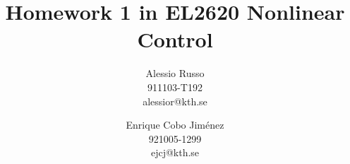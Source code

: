 \documentclass[a4paper,twocolumn]{article} %
\begin{document}

\title{Homework 1 in EL2620 Nonlinear Control}
\author{Alessio Russo \\ 911103-T192 \\ alessior@kth.se \and Enrique Cobo Jim\'enez\\
  921005-1299 \\ ejcj@kth.se}

\maketitle                     %















\end{document}
